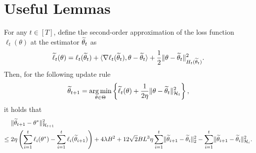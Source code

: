 \section{Useful Lemmas}
\begin{myLemma}
    \label{lem:estimation-error}
    For any $t \in [T]$, define the second-order approximation of the loss function $\ell_t(\theta)$ at the estimator $\widetilde{\theta}_{t}$ as $$\widetilde{\ell}_{t}(\theta) = \ell_{t}(\widetilde{\theta}_{t}) + \langle \nabla \ell_{t}(\widetilde{\theta}_{t}), \theta - \widetilde{\theta}_{t} \rangle + \frac{1}{2} \lVert\theta - \widetilde{\theta}_{t}\rVert_{H_{t}(\widetilde{\theta}_{t})}^2.$$ Then, for the following update rule
    \begin{align*}
        \widetilde{\theta}_{t+1} = \operatorname*{arg\,min}_{\theta \in \Theta} \left\{\widetilde{\ell}_t(\theta) + \frac{1}{2\eta} \lVert\theta - \widetilde{\theta}_t\rVert_{\mathcal{H}_t}^2\right\},
    \end{align*}
    it holds that
    \begin{align*}
        {}&\lVert\widetilde{\theta}_{t+1} - \theta^*\rVert_{\mathcal{H}_{t+1}}^2 \\
        \leq {}& 2 \eta \left(\sum_{i=1}^t \ell_{i}(\theta^*) - \sum_{i=1}^t \ell_{i}(\widetilde{\theta}_{i+1}) \right) + 4 \lambda B^2                                    + 12 \sqrt{2} B L^3 \eta \sum_{i=1}^t \lVert\widetilde{\theta}_{i+1} - \widetilde{\theta}_{i}\rVert_2^2 - \sum_{i=1}^t \lVert\widetilde{\theta}_{i+1} - \widetilde{\theta}_{i}\rVert_{\mathcal{H}_{i}}^2.
    \end{align*}
\end{myLemma}
